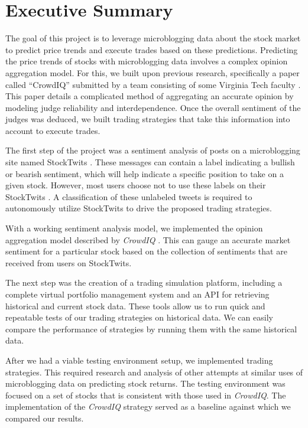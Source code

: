 
\section{Executive Summary}

The goal of this project is to leverage microblogging data about the stock market to predict price trends and execute trades based on these predictions.
Predicting the price trends of stocks with microblogging data involves a complex opinion aggregation model.
For this, we built upon previous research, specifically a paper called ``CrowdIQ'' submitted by a team consisting of some Virginia Tech faculty \cite{crowdiq}.
This paper details a complicated method of aggregating an accurate opinion by modeling judge reliability and interdependence.
Once the overall sentiment of the judges was deduced, we built trading strategies that take this information into account to execute trades.

The first step of the project was a sentiment analysis of posts on a microblogging site named StockTwits \cite{stocktwits}.
These messages can contain a label indicating a bullish or bearish sentiment, which will help indicate a specific position to take on a given stock.
However, most users choose not to use these labels on their StockTwits \cite{crowdiq}.
A classification of these unlabeled tweets is required to autonomously utilize StockTwits to drive the proposed trading strategies.

With a working sentiment analysis model, we implemented the opinion aggregation model described by \textit{CrowdIQ} \cite{crowdiq}.
This can gauge an accurate market sentiment for a particular stock based on the collection of sentiments that are received from users on StockTwits.

The next step was the creation of a trading simulation platform, including a complete virtual portfolio management system and an API for retrieving historical and current stock data.
These tools allow us to run quick and repeatable tests of our trading strategies on historical data.
We can easily compare the performance of strategies by running them with the same historical data.

After we had a viable testing environment setup, we implemented trading strategies.
This required research and analysis of other attempts at similar uses of microblogging data on predicting stock returns.
The testing environment was focused on a set of stocks that is consistent with those used in \textit{CrowdIQ}.
The implementation of the \textit{CrowdIQ} strategy served as a baseline against which we compared our results.

